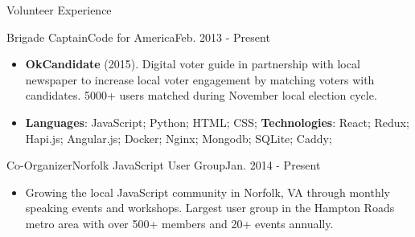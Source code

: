 \documentclass[]{mcdowellcv}
\begin{document}
    \begin{cvsection}{Volunteer Experience}
        \begin{cvsubsection}{Brigade Captain}{Code for America}{Feb. 2013 - Present}
            \begin{itemize}
                \item \textbf{OkCandidate} (2015). Digital voter guide in partnership with local newspaper to increase local voter engagement by matching voters with candidates. 5000+ users matched during November local election cycle.
            \end{itemize}
            \begin{itemize}
                 \item \textbf{Languages}:  JavaScript; Python; HTML; CSS; \newline
                \textbf{Technologies}: React; Redux; Hapi.js; Angular.js; Docker; Nginx; Mongodb; SQLite; Caddy;
            \end{itemize}

        \end{cvsubsection}

        \begin{cvsubsection}{Co-Organizer}{Norfolk JavaScript User Group}{Jan. 2014 - Present}
            \begin{itemize}
                \item Growing the local JavaScript community in Norfolk, VA through monthly speaking events and workshops. Largest user group in the Hampton Roads metro area with over 500+ members and 20+ events annually.
            \end{itemize}
        \end{cvsubsection}
    \end{cvsection}
\end{document}
